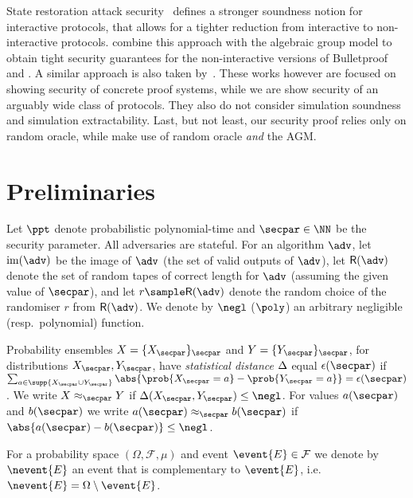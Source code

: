 \documentclass[runningheads,10pt]{llncs}
\begin{document}
State restoration attack security~\cite{TCC:BenChiSpo16,EPRINT:Holmgren19}
defines a stronger soundness notion for interactive protocols, that allows for a
tighter reduction from interactive to non-interactive
protocols. \cite{cryptoeprint:2020:1351} combine this approach with the
algebraic group model to obtain tight security guarantees for the
non-interactive versions of Bulletproof~\cite{SP:BBBPWM18} and \sonic. A similar
approach is also taken by~\cite{cryptoeprint:2019:1177}. These works however are
focused on showing security of concrete proof systems, while we are show
security of an arguably wide class of protocols. They also do not consider
simulation soundness and simulation extractability. Last, but not least, our
security proof relies only on random oracle, while
\cite{cryptoeprint:2020:1351,cryptoeprint:2019:1177} make use of random oracle
\emph{and} the AGM.

\section{Preliminaries}
\label{sec:preliminaries}
Let $\ppt$ denote probabilistic polynomial-time and $\secpar \in \NN$ be the
security parameter. All adversaries are stateful. For an algorithm $\adv$, let
$\image (\adv)$ be the image of $\adv$ (the set of valid outputs of $\adv$), let
$\RND{\adv}$ denote the set of random tapes of correct length for $\adv$
(assuming the given value of $\secpar$), and let $r \sample \RND{\adv}$ denote
the random choice of the randomiser $r$ from $\RND{\adv}$. We denote by $\negl$
($\poly$) an arbitrary negligible (resp.~polynomial) function.

Probability ensembles $X = \smallset{X_\secpar}_\secpar$ and $Y =
\smallset{Y_\secpar}_\secpar$, for distributions $X_\secpar, Y_\secpar$, have
\emph{statistical distance} $\Delta$ equal $\epsilon(\secpar)$ if $\sum_{a \in
  \supp{X_\secpar \cup Y_\secpar}} \abs{\prob{X_\secpar = a} - \prob{Y_\secpar =
    a}} = \epsilon(\secpar)$. We write $X \approx_\secpar Y$ if $\SD(X_\secpar,
Y_\secpar) \leq \negl$. For values $a(\secpar)$ and $b(\secpar)$ we write
$a(\secpar) \approx_\secpar b(\secpar)$ if $\abs{a(\secpar) - b(\secpar)} \leq
\negl$.

\newcommand{\samplespace}{\Omega}
\newcommand{\eventspace}{\mathcal{F}}
\newcommand{\probfunction}{\mu}

For a probability space $(\samplespace, \eventspace, \probfunction)$ and event
$\event{E} \in \eventspace$ we denote by $\nevent{E}$ an event that is
complementary to $\event{E}$,
i.e.~$\nevent{E} = \samplespace \setminus \event{E}$.
\end{document}
